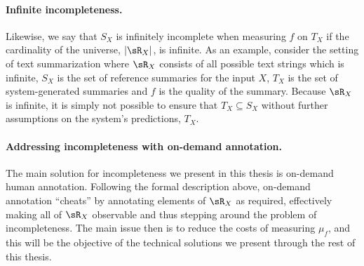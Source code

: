 \paragraph{Infinite incompleteness.}
Likewise, we say that $S_X$ is infinitely incomplete when measuring $f$ on $T_X$ if the cardinality of the universe, $|\sR_X|$, is infinite.
As an example, consider the setting of text summarization where $\sR_X$ consists of all possible text strings which is infinite, $S_X$ is the set of reference summaries for the input $X$, $T_X$ is the set of system-generated summaries and $f$ is the quality of the summary.
Because $\sR_X$ is infinite, it is simply not possible to ensure that $T_X \subseteq S_X$ without further assumptions on the system's predictions, $T_X$.

\paragraph{Addressing incompleteness with on-demand annotation.}
The main solution for incompleteness we present in this thesis is on-demand human annotation.
Following the formal description above, on-demand annotation ``cheats'' by annotating elements of $\sR_X$ as required, effectively making all of $\sR_X$ observable and thus stepping around the problem of incompleteness.
The main issue then is to reduce the costs of measuring $\mu_f$, and this will be the objective of the technical solutions we present through the rest of this thesis.

% 
% 
